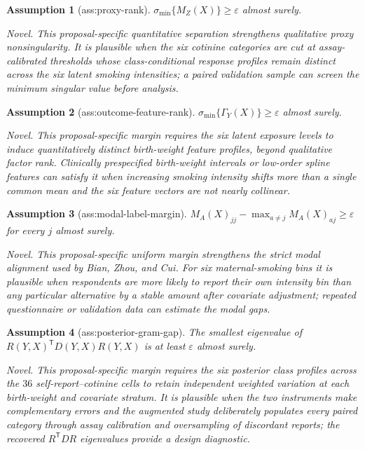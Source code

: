 \documentclass{article}
\newtheorem{assumption}{Assumption}
\begin{document}
\begin{assumption}[ass:proxy-rank]\label{ass:proxy-rank}
\(\sigma_{\min}\{M_Z(X)\}\geq\varepsilon\) almost surely.
\par\smallskip\noindent\emph{Novel.} This proposal-specific quantitative separation strengthens qualitative proxy nonsingularity. It is plausible when the six cotinine categories are cut at assay-calibrated thresholds whose class-conditional response profiles remain distinct across the six latent smoking intensities; a paired validation sample can screen the minimum singular value before analysis.
\end{assumption}

\begin{assumption}[ass:outcome-feature-rank]\label{ass:outcome-feature-rank}
\(\sigma_{\min}\{\Gamma_Y(X)\}\geq\varepsilon\) almost surely.
\par\smallskip\noindent\emph{Novel.} This proposal-specific margin requires the six latent exposure levels to induce quantitatively distinct birth-weight feature profiles, beyond qualitative factor rank. Clinically prespecified birth-weight intervals or low-order spline features can satisfy it when increasing smoking intensity shifts more than a single common mean and the six feature vectors are not nearly collinear.
\end{assumption}

\begin{assumption}[ass:modal-label-margin]\label{ass:modal-label-margin}
\(M_A(X)_{jj}-\max_{a\neq j}M_A(X)_{aj}\geq\varepsilon\) for every \(j\) almost surely.
\par\smallskip\noindent\emph{Novel.} This proposal-specific uniform margin strengthens the strict modal alignment used by Bian, Zhou, and Cui. For six maternal-smoking bins it is plausible when respondents are more likely to report their own intensity bin than any particular alternative by a stable amount after covariate adjustment; repeated questionnaire or validation data can estimate the modal gaps.
\end{assumption}

\begin{assumption}[ass:posterior-gram-gap]\label{ass:posterior-gram-gap}
The smallest eigenvalue of \(R(Y,X)^{\mathsf T}D(Y,X)R(Y,X)\) is at least \(\varepsilon\) almost surely.
\par\smallskip\noindent\emph{Novel.} This proposal-specific margin requires the six posterior class profiles across the \(36\) self-report--cotinine cells to retain independent weighted variation at each birth-weight and covariate stratum. It is plausible when the two instruments make complementary errors and the augmented study deliberately populates every paired category through assay calibration and oversampling of discordant reports; the recovered \(R^{\mathsf T}DR\) eigenvalues provide a design diagnostic.
\end{assumption}
\end{document}

